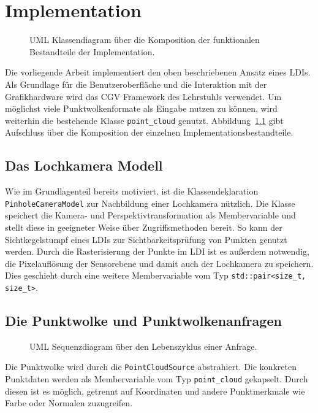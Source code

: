 \documentclass[hyperref, beleg, german]{cgvpub}
\begin{document}
\chapter{Implementation}

\begin{figure}
	\centering
	
	\caption{UML Klassendiagram über die Komposition der funktionalen 
	Bestandteile der Implementation.}%
	\label{fig:umloverview}
\end{figure}

Die vorliegende Arbeit implementiert den oben beschriebenen Ansatz eines LDIs.
Als Grundlage für die Benutzeroberfläche und die Interaktion mit der
Grafikhardware wird das CGV Framework des Lehrstuhls verwendet. Um möglichst
viele Punktwolkenformate als Eingabe nutzen zu können, wird weiterhin die
bestehende Klasse \texttt{point\_cloud} genutzt.
Abbildung~\ref{fig:umloverview} gibt Aufschluss über die Komposition der
einzelnen Implementationsbestandteile.

\section{Das Lochkamera Modell}

Wie im Grundlagenteil bereits motiviert, ist die Klassendeklaration
\texttt{PinholeCameraModel} zur Nachbildung einer Lochkamera nützlich. Die
Klasse speichert die Kamera- und Perspektivtransformation als Membervariable
und stellt diese in geeigneter Weise über Zugriffsmethoden bereit. So kann der
Sichtkegelstumpf eines LDIs zur Sichtbarkeitsprüfung von Punkten genutzt
werden. Durch die Rasterisierung der Punkte im LDI ist es außerdem notwendig,
die Pixelauflösung der Sensorebene und damit auch der Lochkamera zu speichern.
Dies geschieht durch eine weitere Membervariable vom Typ
\texttt{std::pair<size\_t, size\_t>}.

\section{Die Punktwolke und Punktwolkenanfragen}

\begin{figure}
	\centering
	
	\caption{UML Sequenzdiagram über den Lebenszyklus einer 
	Anfrage.}%
	\label{fig:umlquerylife}
\end{figure}

Die Punktwolke wird durch die \texttt{PointCloudSource} abstrahiert. Die
konkreten Punktdaten werden als Membervariable vom Typ \texttt{point\_cloud}
gekapselt. Durch diesen ist es möglich, getrennt auf Koordinaten und andere
Punktmerkmale wie Farbe oder Normalen zuzugreifen.
\end{document}
